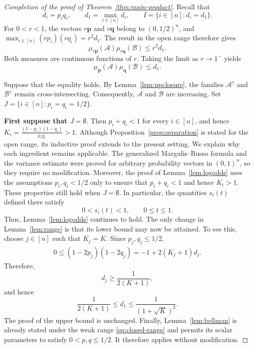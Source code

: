 \documentclass[11pt]{article}
\numberwithin{equation}{section}
\theoremstyle{definition}
\theoremstyle{remark}
\newcommand{\up}{\uparrow}
\begin{document}
\begin{proof}[Completion of the proof of Theorem~\ref{thm:main-product}]
Recall that
\begin{equation*}
 d_i=p_iq_i,
 \qquad
 d_1=\max_{i\in[n]}d_i,
 \qquad
 I=\{i\in[n]:d_i=d_1\}.
\end{equation*}
For $0<r<1$, the vectors $r\mathbf p$ and $r\mathbf q$ belong to
$(0,1/2)^n$, and
$
 \max_{i\in[n]}(rp_i)(rq_i)=r^2d_1.
$
The result in the open range therefore gives
\begin{equation*}
 \mu_{r\mathbf p}(\mathcal{A})
 \mu_{r\mathbf q}(\mathcal{B})
 \leq r^2d_1.
\end{equation*}
Both measures are continuous functions of $r$.  Taking the limit as
$r\to1^{-}$ yields
\begin{equation*}
 \mu_{\mathbf p}(\mathcal{A})
 \mu_{\mathbf q}(\mathcal{B})
 \leq d_1.
\end{equation*}

Suppose that the equality holds.  By
Lemma~\ref{lem:upclosure}, the families
$\mathcal{A}^{\up}$ and $\mathcal{B}^{\up}$ remain cross-intersecting.
Consequently,
$\mathcal{A}$ and $\mathcal{B}$ are increasing.
Set
$
 J=\{i\in[n]:p_i=q_i=1/2\}.
$

\textbf{First suppose that $J=\emptyset$}.  Then
$p_i+q_i<1$ for every $i\in[n]$, and hence
$
 K_i=\frac{(1-p_i)(1-q_i)}{p_iq_i}>1.
$
Although Proposition~\ref{prop:separation} is stated for the open
range, its inductive proof extends to the present setting.  We explain
why each ingredient remains applicable.
The generalized Margulis--Russo formula and the variance estimate were
proved for arbitrary probability vectors in $(0,1)^n$, so they require
no modification.  Moreover, the proof of
Lemma~\ref{lem:logodds} uses the assumptions
$p_i,q_i<1/2$ only to ensure that $p_i+q_i<1$ and hence $K_i>1$.
These properties still hold when $J=\emptyset$.  In particular, the
quantities $s_i(t)$ defined there satisfy
\begin{equation*}
 0<s_i(t)<1,
 \qquad  0\leq t\leq1.
\end{equation*}
Thus,  Lemma~\ref{lem:logodds} continues to hold.
The only change in Lemma~\ref{lem:range} is that its lower bound may
now be attained.  To see this, choose $j\in[n]$ such that $K_j=K$.
Since $p_j,q_j\leq1/2$,
\begin{align*}
 0\leq(1-2p_j)(1-2q_j)=-1+2(K_j+1)d_j.
\end{align*}
Therefore,
\begin{equation*}
 d_j\geq\frac{1}{2(K+1)},
\end{equation*}
and hence
\begin{equation}
 \frac{1}{2(K+1)}
 \leq d_1
 \leq
 \frac{1}{(1+\sqrt K)^2}.
 \label{eq:closed-range}
\end{equation}
The proof of the upper bound is unchanged.  Finally,
Lemma~\ref{lem:bellman} is already stated under the weak range
\eqref{eq:closed-range} and permits its scalar parameters to satisfy
$0<p,q\leq1/2$.  It therefore applies without modification.


\end{proof}
\end{document}
